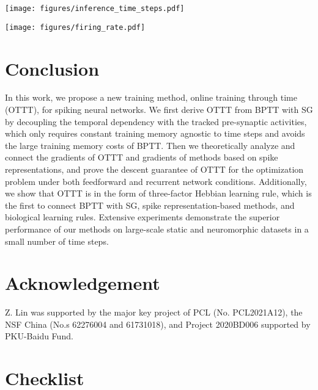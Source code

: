 \documentclass{article}
\begin{document}
\begin{minipage}{0.48\linewidth}
	\centering
	\small
	\texttt{[image: figures/inference\_time\_steps.pdf]}
	\label{inference time step}
\end{minipage}
\hspace{4mm}
\begin{minipage}{0.48\linewidth}
	\centering
	\small
	\texttt{[image: figures/firing\_rate.pdf]}
	\label{firing rate}
\end{minipage}


\section{Conclusion}
\vspace{-2mm}

In this work, we propose a new training method, online training through time (OTTT), for spiking neural networks. We first derive OTTT from BPTT with SG by decoupling the temporal dependency with the tracked pre-synaptic activities, which only requires constant training memory agnostic to time steps and avoids the large training memory costs of BPTT. Then we theoretically analyze and connect the gradients of OTTT and gradients of methods based on spike representations, and prove the descent guarantee of OTTT for the optimization problem under both feedforward and recurrent network conditions. Additionally, we show that OTTT is in the form of three-factor Hebbian learning rule, which is the first to connect BPTT with SG, spike representation-based methods, and biological learning rules. Extensive experiments demonstrate the superior performance of our methods on large-scale static and neuromorphic datasets in a small number of time steps.

\section*{Acknowledgement} 
Z. Lin was supported by the major key project of PCL (No. PCL2021A12), the NSF China (No.s 62276004 and 61731018), and Project 2020BD006 supported by PKU-Baidu Fund.

\small



\section*{Checklist}
\end{document}
